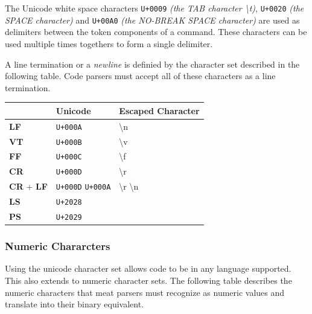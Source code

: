 \documentclass [10pt]{article}
\begin{document}
The Unicode white space characters \texttt{U+0009}
\textit{(the TAB character \textbackslash t)}, \texttt{U+0020}
\textit{(the SPACE character)} and
\texttt{U+00A0} \textit{(the NO-BREAK SPACE character)} are used as delimiters
between the token components of a command. These characters can be used
multiple times togethers to form a single delimiter.

A line termination or a \textit{newline} is definied by the character set
described in the following table. Code parsers must accept all of these
characters as a line termination.

\begin{center}
  \begin{tabular}{|l|l|l|}
    \hline
    & \textbf{Unicode} & \textbf{Escaped Character} \\ \hline
    \textbf{LF} & \texttt{U+000A} & \textbackslash n \\ \hline
    \textbf{VT} & \texttt{U+000B} & \textbackslash v \\ \hline
    \textbf{FF} & \texttt{U+000C} & \textbackslash f \\ \hline
    \textbf{CR} & \texttt{U+000D} & \textbackslash r \\ \hline
    \textbf{CR} + \textbf{LF} & \texttt{U+000D} \texttt{U+000A} &
    \textbackslash r \textbackslash n \\ \hline
    \textbf{LS} & \texttt{U+2028} & \\ \hline
    \textbf{PS} & \texttt{U+2029} & \\ \hline
  \end{tabular}
\end{center}

\subsubsection {Numeric Chararcters}

Using the unicode character set allows code to be in any language supported.
This also extends to numeric character sets. The following table describes the
numeric characters that meat parsers must recognize as numeric values and
translate into their binary equivalent.
\end{document}

